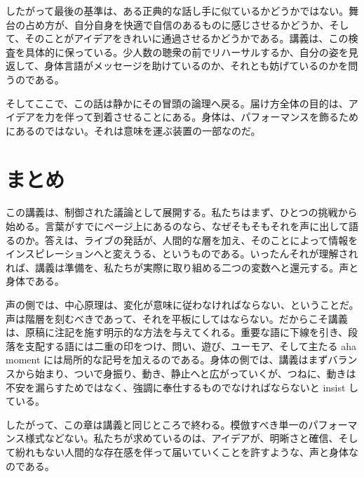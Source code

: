 したがって最後の基準は、ある正典的な話し手に似ているかどうかではない。舞台の占め方が、自分自身を快適で自信のあるものに感じさせるかどうか、そして、そのことがアイデアをきれいに通過させるかどうかである。講義は、この検査を具体的に保っている。少人数の聴衆の前でリハーサルするか、自分の姿を見返して、身体言語がメッセージを助けているのか、それとも妨げているのかを問うのである。

そしてここで、この話は静かにその冒頭の論理へ戻る。届け方全体の目的は、アイデアを力を伴って到着させることにある。身体は、パフォーマンスを飾るためにあるのではない。それは意味を運ぶ装置の一部なのだ。

\section{まとめ}

この講義は、制御された議論として展開する。私たちはまず、ひとつの挑戦から始める。言葉がすでにページ上にあるのなら、なぜそもそもそれを声に出して語るのか。答えは、ライブの発話が、人間的な層を加え、そのことによって情報をインスピレーションへと変えうる、というものである。いったんそれが理解されれば、講義は準備を、私たちが実際に取り組める二つの変数へと還元する。声と身体である。

声の側では、中心原理は、変化が意味に従わなければならない、ということだ。声は階層を刻むべきであって、それを平板にしてはならない。だからこそ講義は、原稿に注記を施す明示的な方法を与えてくれる。重要な語に下線を引き、段落を支配する語には二重の印をつけ、問い、遊び、ユーモア、そして主たる aha moment には局所的な記号を加えるのである。身体の側では、講義はまずバランスから始まり、ついで身振り、動き、静止へと広がっていくが、つねに、動きは不安を漏らすためではなく、強調に奉仕するものでなければならないと insist している。

したがって、この章は講義と同じところで終わる。模倣すべき単一のパフォーマンス様式などない。私たちが求めているのは、アイデアが、明晰さと確信、そして紛れもない人間的な存在感を伴って届いていくことを許すような、声と身体なのである。